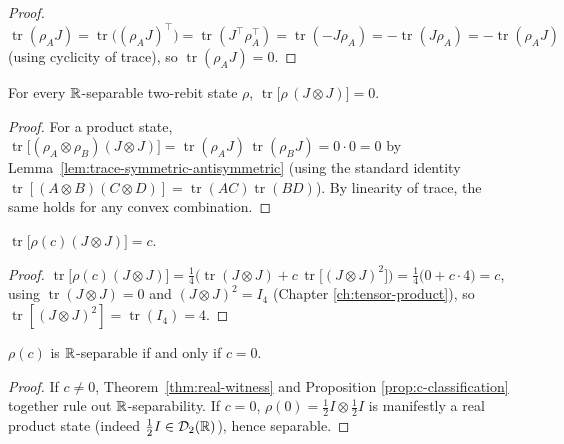 \begin{proof}
$\operatorname{tr}(\rho_A J) = \operatorname{tr}\big((\rho_A J)^\top\big) =
\operatorname{tr}(J^\top \rho_A^\top) = \operatorname{tr}(-J\rho_A) =
-\operatorname{tr}(J\rho_A) = -\operatorname{tr}(\rho_A J)$ (using
cyclicity of trace), so $\operatorname{tr}(\rho_A J) = 0$.
\end{proof}

\begin{theorem}
\label{thm:real-witness}
For every $\mathbb{R}$-separable two-rebit state $\rho$, $\operatorname{tr}\big[\rho\,
(J\otimes J)\big] = 0$.
\end{theorem}

\begin{proof}
For a product state, $\operatorname{tr}\big[(\rho_A\otimes\rho_B)(J\otimes
J)\big] = \operatorname{tr}(\rho_A J)\,\operatorname{tr}(\rho_B J) = 0\cdot 0 =
0$ by Lemma~\ref{lem:trace-symmetric-antisymmetric} (using the standard
identity $\operatorname{tr}[(A\otimes B)(C\otimes D)] = \operatorname{tr}(AC)
\operatorname{tr}(BD)$). By linearity of trace, the same holds for any convex
combination.
\end{proof}

\begin{proposition}
\label{prop:c-classification}
$\operatorname{tr}\big[\rho(c)(J\otimes J)\big] = c$.
\end{proposition}

\begin{proof}
$\operatorname{tr}\big[\rho(c)(J\otimes J)\big] = \tfrac14\big(
\operatorname{tr}(J\otimes J) + c\,\operatorname{tr}\big[(J\otimes J)^2\big]
\big) = \tfrac14\big(0 + c\cdot 4\big) = c$, using
$\operatorname{tr}(J\otimes J)=0$ and $(J\otimes J)^2 = I_4$ (Chapter
\ref{ch:tensor-product}), so $\operatorname{tr}[(J\otimes J)^2] =
\operatorname{tr}(I_4) = 4$.
\end{proof}

\begin{corollary}
\label{cor:real-classification}
$\rho(c)$ is $\mathbb{R}$-separable if and only if $c=0$.
\end{corollary}

\begin{proof}
If $c\ne0$, Theorem~\ref{thm:real-witness} and Proposition
\ref{prop:c-classification} together rule out $\mathbb{R}$-separability. If $c=0$,
$\rho(0) = \tfrac12I \otimes \tfrac12I$ is manifestly a real product state
(indeed $\tfrac12I \in \mathcal D_2(\mathbb{R})$), hence separable.
\end{proof}

